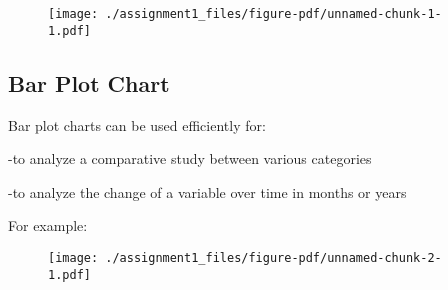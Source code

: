 \documentclass[
  letterpaper,
  DIV=11,
  numbers=noendperiod]{scrreprt}
\newenvironment{Shaded}{\begin{snugshade}}{\end{snugshade}}
\newcommand{\AttributeTok}[1]{\textcolor[rgb]{0.40,0.45,0.13}{#1}}
\newcommand{\ConstantTok}[1]{\textcolor[rgb]{0.56,0.35,0.01}{#1}}
\newcommand{\DecValTok}[1]{\textcolor[rgb]{0.68,0.00,0.00}{#1}}
\newcommand{\DocumentationTok}[1]{\textcolor[rgb]{0.37,0.37,0.37}{\textit{#1}}}
\newcommand{\FloatTok}[1]{\textcolor[rgb]{0.68,0.00,0.00}{#1}}
\newcommand{\FunctionTok}[1]{\textcolor[rgb]{0.28,0.35,0.67}{#1}}
\newcommand{\NormalTok}[1]{\textcolor[rgb]{0.00,0.23,0.31}{#1}}
\newcommand{\SpecialCharTok}[1]{\textcolor[rgb]{0.37,0.37,0.37}{#1}}
\newcommand{\StringTok}[1]{\textcolor[rgb]{0.13,0.47,0.30}{#1}}
\begin{document}
\begin{Shaded}
\end{Shaded}

\begin{figure}[H]

{\centering \texttt{[image: ./assignment1\_files/figure-pdf/unnamed-chunk-1-1.pdf]}

}

\end{figure}

\hypertarget{bar-plot-chart}{%
\subsection{Bar Plot Chart}\label{bar-plot-chart}}

Bar plot charts can be used efficiently for:

-to analyze a comparative study between various categories

-to analyze the change of a variable over time in months or years

For example:

\begin{Shaded}
\end{Shaded}

\begin{figure}[H]

{\centering \texttt{[image: ./assignment1\_files/figure-pdf/unnamed-chunk-2-1.pdf]}

}

\end{figure}
\end{document}
